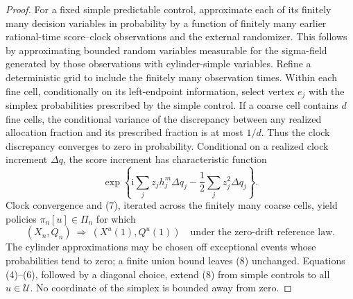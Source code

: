 \documentclass{article}
\begin{document}
\begin{proof}
For a fixed simple predictable control, approximate each of its finitely many decision variables in probability by a function of finitely many earlier rational-time score--clock observations and the external randomizer.  This follows by approximating bounded random variables measurable for the sigma-field generated by those observations with cylinder-simple variables.  Refine a deterministic grid to include the finitely many observation times.  Within each fine cell, conditionally on its left-endpoint information, select vertex \(e_j\) with the simplex probabilities prescribed by the simple control.  If a coarse cell contains \(d\) fine cells, the conditional variance of the discrepancy between any realized allocation fraction and its prescribed fraction is at most \(1/d\).  Thus the clock discrepancy converges to zero in probability.  Conditional on a realized clock increment \(\Delta q\), the score increment has characteristic function
\[
 \exp\!\left\{
   \mathrm i\sum_jz_jh_j^m\Delta q_j
   -\frac12\sum_jz_j^2\Delta q_j
 \right\}.                                                       \tag{7}
\]
Clock convergence and (7), iterated across the finitely many coarse cells, yield policies \(\pi_n[u]\in\Pi_n\) for which
\[
 (X_n,Q_n)\ \Longrightarrow\ (X^u(1),Q^u(1))
 \quad\text{under the zero-drift reference law}.                 \tag{8}
\]
The cylinder approximations may be chosen off exceptional events whose probabilities tend to zero; a finite union bound leaves (8) unchanged.  Equations (4)--(6), followed by a diagonal choice, extend (8) from simple controls to all \(u\in\mathcal U\).  No coordinate of the simplex is bounded away from zero.


\end{proof}
\end{document}
